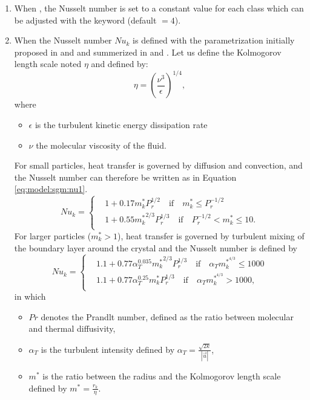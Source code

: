 \begin{enumerate}
\item When , the Nusselt number is set to a constant value for each class which can be adjusted
with the keyword  (default $= 4$).

\item When 
the Nusselt number $Nu_k$ is defined with the parametrization initially proposed in \cite{Batchelor_1980} and
\cite{wadia_1974} and summerized in \cite{daly_1984} and \cite{holland_2006}.
Let us define the Kolmogorov length scale
noted $\eta$ and defined by:
\begin{equation}
\eta = \left( \dfrac{\nu^3}{\epsilon} \right)^{1/4},
\label{eq:model:sgm:turbulent_dissipation_rate}
\end{equation}
where
\begin{itemize}
	\item $\epsilon$ is the turbulent kinetic energy dissipation rate
	\item $\nu$ the molecular viscosity of the fluid.
\end{itemize}
For small particles, heat transfer is governed by diffusion and convection, and the Nusselt number can therefore
be written as in Equation \ref{eq:model:sgm:nu1}.
\begin{equation}
Nu_{k} =
\left\lbrace
	\begin{matrix}
	& 1 + 0.17 m_k^{*} P_{r}^{1/2} \quad \text{if} \quad m_k^{*} \leq P_{r}^{-1/2} \\
	& 1 + 0.55 {m_k^{*}}^{2/3} P_{r}^{1/3} \quad \text{if} \quad P_{r}^{-1/2}<m_k^{*} \leq 10. \\
\end{matrix}
\right.
\label{eq:model:sgm:nu1}
\end{equation}
For larger particles ($m_k^{*}>1$), heat transfer is governed by turbulent mixing of the boundary layer around the crystal and the Nusselt number is defined by
\begin{equation}
Nu_{k} =
\left\lbrace
	\begin{matrix}
	& 1.1 + 0.77 \alpha_{T}^{0.035} {m_k^{*}}^{2/3} P_{r}^{1/3}\quad \text{if} \quad \alpha _{T}m_k^{*^{4/3}} \leq 1000 \\
	& 1.1 + 0.77 \alpha_{T}^{0.25} m_k^{*} P_{r}^{1/3} \quad \text{if} \quad \alpha _{T}m_k^{*^{4/3}} > 1000, \\
\end{matrix}
\right.
\label{eq:model:sgm:nu2}
\end{equation}
in which
\begin{itemize}
	\item $Pr$ denotes the Prandlt number, defined as the ratio between molecular and thermal diffusivity,
    \item $\alpha_{T}$ is the turbulent intensity defined by $\alpha_{T} = \frac{\sqrt{2k}}{|\vec{u}|}$,
	\item $m^{*}$ is the ratio between the radius and the Kolmogorov length scale defined by $m^{*}=\frac{r_{k}}{\eta}$.
\end{itemize}


\end{enumerate}
